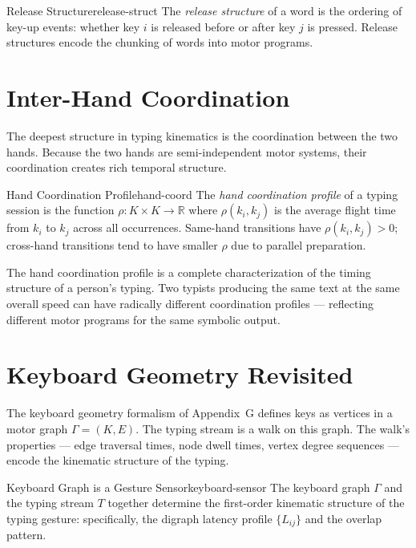 \begin{definition}{Release Structure}{release-struct}
  The \emph{release structure} of a word is the ordering of key-up events:
  whether key $i$ is released before or after key $j$ is pressed.
  Release structures encode the chunking of words into motor programs.
\end{definition}

\section{Inter-Hand Coordination}

The deepest structure in typing kinematics is the coordination between
the two hands. Because the two hands are semi-independent motor systems,
their coordination creates rich temporal structure.

\begin{definition}{Hand Coordination Profile}{hand-coord}
  The \emph{hand coordination profile} of a typing session is the
  function $\rho : K \times K \to \mathbb{R}$ where $\rho(k_i, k_j)$
  is the average flight time from $k_i$ to $k_j$ across all occurrences.
  Same-hand transitions have $\rho(k_i,k_j) > 0$; cross-hand transitions
  tend to have smaller $\rho$ due to parallel preparation.
\end{definition}

The hand coordination profile is a complete characterization of the
timing structure of a person's typing. Two typists producing the same
text at the same overall speed can have radically different coordination
profiles — reflecting different motor programs for the same symbolic output.

\section{Keyboard Geometry Revisited}

The keyboard geometry formalism of Appendix~G defines keys as vertices
in a motor graph $\Gamma = (K, E)$. The typing stream is a walk on
this graph. The walk's properties — edge traversal times, node dwell
times, vertex degree sequences — encode the kinematic structure of
the typing.

\begin{theorem}{Keyboard Graph is a Gesture Sensor}{keyboard-sensor}
  The keyboard graph $\Gamma$ and the typing stream $T$ together
  determine the first-order kinematic structure of the typing gesture:
  specifically, the digraph latency profile $\{L_{ij}\}$ and the
  overlap pattern.
\end{theorem}

